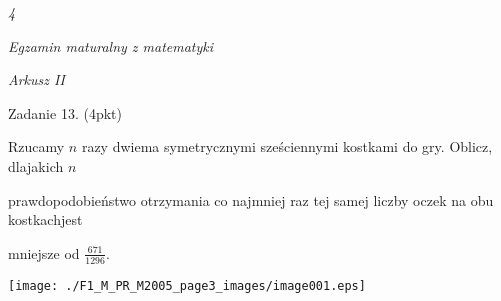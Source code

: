 \documentclass[a4paper,12pt]{article}
\begin{document}
{\it 4}

{\it Egzamin maturalny z matematyki}

{\it Arkusz II}

Zadanie 13. (4pkt)

Rzucamy $n$ razy dwiema symetrycznymi sześciennymi kostkami do gry. Oblicz, dlajakich $n$

prawdopodobieństwo otrzymania co najmniej raz tej samej liczby oczek na obu kostkachjest

mniejsze od $\displaystyle \frac{671}{1296}.$
\begin{center}
\texttt{[image: ./F1\_M\_PR\_M2005\_page3\_images/image001.eps]}
\end{center}
\end{document}
